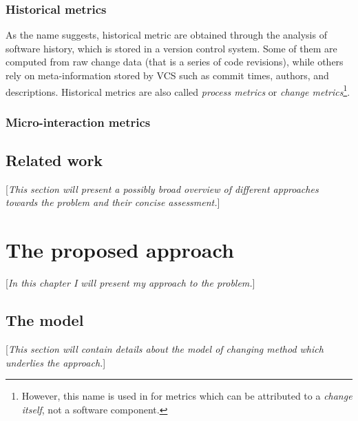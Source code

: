 \documentclass{pracamgr}
\begin{document}

\subsection{Historical metrics}
\label{sec:historical}
As the name suggests, historical metric are obtained through the analysis of software history, which is stored in a version control system. Some of them are computed from raw change data (that is a series of code revisions), while others rely on meta-information stored by VCS such as commit times, authors, and descriptions. Historical metrics are also called \emph{process metrics} or \emph{change metrics}\footnote{However, this name is used in \cite{Fukushima} for metrics which can be attributed to a \textit{change itself}, not a software component.}.




\subsection{Micro-interaction metrics}
\label{sec:micro-interaction}

\section{Related work}
\label{sec:realted_work}
[\textit{This section will present a possibly broad overview of different approaches towards the problem and their concise assessment.}]

\chapter{The proposed approach}
\label{cha:approach}
[\textit{In this chapter I will present my approach to the problem.}]

\section{The model}
\label{sec:model}
[\textit{This section will contain details about the model of changing method which underlies the approach.}]
\end{document}
